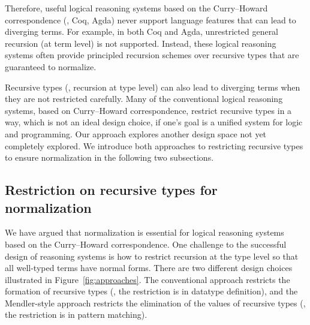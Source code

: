 Therefore, useful logical reasoning systems based on the Curry--Howard
correspondence (\eg, Coq, Agda) never support language features that can
lead to diverging terms. For example, in both Coq and Agda,
unrestricted general recursion (at term level) is not supported. 
Instead, these logical reasoning systems
often provide principled recursion schemes over recursive types that are
guaranteed to normalize. 

Recursive types (\ie, recursion at type level)
can also lead to diverging terms when they are not restricted carefully.
Many of the conventional logical reasoning systems, based on
Curry--Howard correspondence, restrict recursive types in a way,
which is not an ideal design choice, if one's goal is a unified system for
logic and programming. Our approach explores another design space not yet
completely explored. We introduce both approaches to restricting recursive
types to ensure normalization in the following two subsections.


\subsection{Restriction on recursive types for normalization}
\label{APP:sec:intro:concpets:recursive}
We have argued that normalization is essential for logical reasoning systems
based on the Curry--Howard correspondence. One challenge to the successful
design of reasoning systems is how to restrict recursion at the type level
so that all well-typed terms have normal forms. There are two different
design choices illustrated in Figure~\ref{fig:approaches}. 
The conventional approach restricts the formation of recursive types
(\ie, the restriction is in datatype definition), and
the Mendler-style approach restricts the elimination of the values of
recursive types (\ie, the restriction is in pattern matching).


